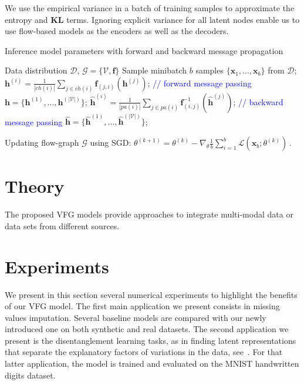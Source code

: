 \documentclass{article} %
\newcommand{\belhal}[1]{{\color{red}{\bf\sf [BK: #1]}}}
\begin{document}
\belhal{To Improve. We should add a paragraph on implementation and ELBO/gradient computation} 
We use the empirical variance in a batch of training samples to approximate the entropy and \textbf{KL} terms. 
\belhal{KL  term between Gaussian priors is tractable, why do we approximate it?}
Ignoring  explicit variance  for all latent nodes enable us to use flow-based models as the encoders as well as the decoders. 





\begin{algorithm}[H]
   \caption{Inference model parameters with  forward and backward message propagation}
   \label{alg:main}
\begin{algorithmic}[1]
    Data distribution $\mathcal{D}$,  $\mathcal{G} = \{\mathcal{V}, \mathbf{f}\}$
   \STATE  Sample minibatch $b$ samples $\{\mathbf{x}_1, ..., \mathbf{x}_b \}$ from $\mathcal{D}$;
   \STATE $\mathbf{h}^{(i)} = \frac{1}{|ch(i)|} \sum_{j \in ch(i) } \mathbf{f}_{(j,i)}(\mathbf{h}^{(j)})$; \label{line:forward} \textcolor{blue}{// forward message passing}
   \ENDFOR
    \STATE  $\mathbf{h} =  \{\mathbf{h}^{(1)}, ...,  \mathbf{h}^{(|\mathcal{V}|)}  \}$;
   \STATE $\widehat{\mathbf{h}}^{(i)} = \frac{1}{|pa(i)|} \sum_{j \in pa(i) } \mathbf{f}^{-1}_{ (i,j)}(\widehat{\mathbf{h}}^{(j)}) $;\label{line:backward}  \textcolor{blue}{// backward message passing}
   \ENDFOR
    \STATE  $ \widehat{\mathbf{h}} =  \{\widehat{\mathbf{h}}^{(1)}, ...,  \widehat{\mathbf{h}}^{(|\mathcal{V}|)}  \}$;
    
    \STATE Updating flow-graph $\mathcal{G}$ using SGD: $\theta^{(k+1)} = \theta^{(k)} -  \nabla_{\theta}\frac{1}{b} \sum_{i=1}^b  \mathcal{L}(\mathbf{x}_b; \theta^{(k)})   \, .$
   \ENDFOR
\end{algorithmic}
\end{algorithm}




\section{Theory}\label{sec:theory}
The proposed VFG models provide approaches to integrate multi-modal data or data sets from different sources. 

\section{Experiments}\label{sec:numerical}
We present in this section several numerical experiments to highlight the benefits of our VFG model.
The first main application we present consists in missing values imputation. Several baseline models are compared with our newly introduced one on both synthetic and real datasets.
The second application we present is the disentanglement learning tasks, as in finding latent representations that separate the explanatory factors of variations in the data, see~\citet{bengio2013representation}.
For that latter application, the model is trained and evaluated on the MNIST handwritten digits dataset.
\end{document}
